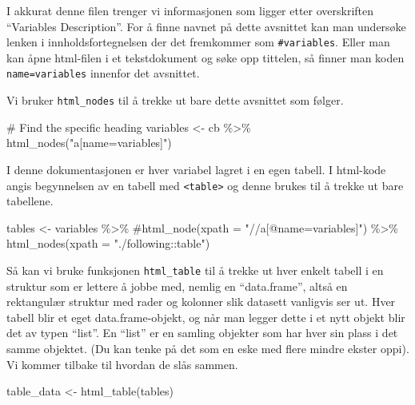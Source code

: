 \documentclass[
  letterpaper,
  DIV=11,
  numbers=noendperiod]{scrreprt}
\newenvironment{Shaded}{\begin{snugshade}}{\end{snugshade}}
\newcommand{\AttributeTok}[1]{\textcolor[rgb]{0.40,0.45,0.13}{#1}}
\newcommand{\CommentTok}[1]{\textcolor[rgb]{0.37,0.37,0.37}{#1}}
\newcommand{\FunctionTok}[1]{\textcolor[rgb]{0.28,0.35,0.67}{#1}}
\newcommand{\NormalTok}[1]{\textcolor[rgb]{0.00,0.23,0.31}{#1}}
\newcommand{\OtherTok}[1]{\textcolor[rgb]{0.00,0.23,0.31}{#1}}
\newcommand{\SpecialCharTok}[1]{\textcolor[rgb]{0.37,0.37,0.37}{#1}}
\newcommand{\StringTok}[1]{\textcolor[rgb]{0.13,0.47,0.30}{#1}}
\theoremstyle{definition}
\theoremstyle{remark}
\begin{document}
I akkurat denne filen trenger vi informasjonen som ligger etter
overskriften ``Variables Description''. For å finne navnet på dette
avsnittet kan man undersøke lenken i innholdsfortegnelsen der det
fremkommer som \texttt{\#variables}. Eller man kan åpne html-filen i et
tekstdokument og søke opp tittelen, så finner man koden
\texttt{name=\textquotesingle{}variables} innenfor det avsnittet.

Vi bruker \texttt{html\_nodes} til å trekke ut bare dette avsnittet som
følger.

\begin{Shaded}
\begin{Highlighting}[]
\CommentTok{\# Find the specific heading}
\NormalTok{variables }\OtherTok{\textless{}{-}}\NormalTok{ cb }\SpecialCharTok{\%\textgreater{}\%} 
  \FunctionTok{html\_nodes}\NormalTok{(}\StringTok{"a[name=\textquotesingle{}variables\textquotesingle{}]"}\NormalTok{)}
\end{Highlighting}
\end{Shaded}

I denne dokumentasjonen er hver variabel lagret i en egen tabell. I
html-kode angis begynnelsen av en tabell med
\texttt{\textless{}table\textgreater{}} og denne brukes til å trekke ut
bare tabellene.

\begin{Shaded}
\begin{Highlighting}[]
\NormalTok{tables }\OtherTok{\textless{}{-}}\NormalTok{ variables }\SpecialCharTok{\%\textgreater{}\%} 
    \CommentTok{\#html\_node(xpath = "//a[@name=\textquotesingle{}variables\textquotesingle{}]") \%\textgreater{}\% }
    \FunctionTok{html\_nodes}\NormalTok{(}\AttributeTok{xpath =} \StringTok{"./following::table"}\NormalTok{)}
\end{Highlighting}
\end{Shaded}

Så kan vi bruke funksjonen \texttt{html\_table} til å trekke ut hver
enkelt tabell i en struktur som er lettere å jobbe med, nemlig en
``data.frame'', altså en rektangulær struktur med rader og kolonner slik
datasett vanligvis ser ut. Hver tabell blir et eget data.frame-objekt,
og når man legger dette i et nytt objekt blir det av typen ``list''. En
``list'' er en samling objekter som har hver sin plass i det samme
objektet. (Du kan tenke på det som en eske med flere mindre ekster
oppi). Vi kommer tilbake til hvordan de slås sammen.

\begin{Shaded}
\begin{Highlighting}[]
\NormalTok{table\_data }\OtherTok{\textless{}{-}} \FunctionTok{html\_table}\NormalTok{(tables)}
\end{Highlighting}
\end{Shaded}
\end{document}
